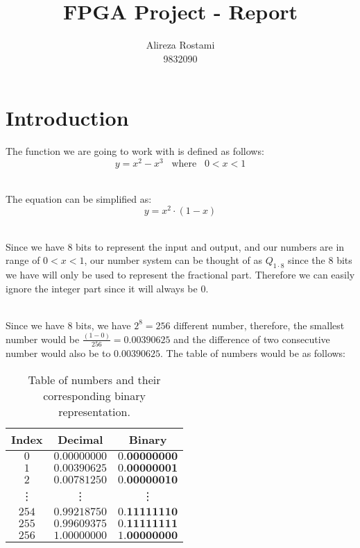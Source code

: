 \documentclass{article}
\title{FPGA Project - Report}
\author{Alireza Rostami \\ 9832090}
\date{}
\let\oldsection\section
\renewcommand{\section}{%
    \setcounter{subsection}{0}%
    \oldsection%
}
\begin{document}
    \maketitle
    \section{Introduction}
    The function we are going to work with is defined as follows:
    \begin{equation}
        y = x^2 - x^3 \; \; \; \text{where} \;\;\; 0<x<1
    \end{equation}
    
    ~\\The equation can be simplified as:
    \begin{equation}
        y = x^2 \cdot (1 - x)
    \end{equation}
    
    ~\\Since we have $ 8 $ bits to represent the input and output, and our numbers are in range of $0 < x < 1$, our number system can be thought of as $ Q_{1 \cdot 8}$ since the $ 8 $ bits we have will only be used to represent the fractional part. Therefore we can easily ignore the integer part since it will always be $ 0 $.
    
    ~\\Since we have $ 8 $ bits, we have $2^8 = 256$ different number, therefore, the smallest number would be $\frac{(1-0)}{256} = 0.00390625$ and the difference of two consecutive number would also be to $0.00390625$. The table of numbers would be as follows:
    \begin{table}[h!]
        \centering
        \begin{tabular}{|c|c|c|}
            \hline
            Index & Decimal & Binary \\
            \hline
            $ 0 $ & $ 0.00000000 $ & $ 0.\boldsymbol{00000000} $  \\ 
            \hline
            $ 1 $ & $ 0.00390625 $ & $ 0.\boldsymbol{00000001} $  \\ 
            \hline
            $ 2 $ & $ 0.00781250 $ & $ 0.\boldsymbol{00000010} $  \\ 
            \hline
            \vdots & \vdots & \vdots \\
            \hline
            $ 254 $ & $ 0.99218750 $ & $ 0.\boldsymbol{11111110} $  \\
            \hline
            $ 255 $ & $ 0.99609375 $ & $ 0.\boldsymbol{11111111} $  \\ 
            \hline
            $ 256 $ & $ 1.00000000 $ & $ 1.\boldsymbol{00000000} $  \\ 
            \hline
        \end{tabular}
        \caption{Table of numbers and their corresponding binary representation.}
        \label{table:table_of_numbers}
    \end{table}
    
\end{document}
